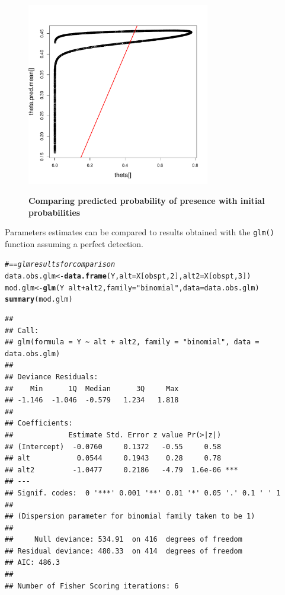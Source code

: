 \documentclass[a4paper, 12pt, leqno]{article}\usepackage[]{graphicx}\usepackage[]{color}
\makeatletter
\newcommand{\hlnum}[1]{\textcolor[rgb]{0.686,0.059,0.569}{#1}}%
\newcommand{\hlstr}[1]{\textcolor[rgb]{0.192,0.494,0.8}{#1}}%
\newcommand{\hlcom}[1]{\textcolor[rgb]{0.678,0.584,0.686}{\textit{#1}}}%
\newcommand{\hlopt}[1]{\textcolor[rgb]{0,0,0}{#1}}%
\newcommand{\hlstd}[1]{\textcolor[rgb]{0.345,0.345,0.345}{#1}}%
\newcommand{\hlkwb}[1]{\textcolor[rgb]{0.69,0.353,0.396}{#1}}%
\newcommand{\hlkwc}[1]{\textcolor[rgb]{0.333,0.667,0.333}{#1}}%
\newcommand{\hlkwd}[1]{\textcolor[rgb]{0.737,0.353,0.396}{\textbf{#1}}}%
\newenvironment{kframe}{%
 \def\at@end@of@kframe{}%
 \ifinner\ifhmode%
  \def\at@end@of@kframe{\end{minipage}}%
  \begin{minipage}{\columnwidth}%
 \fi\fi%
 \def\FrameCommand##1{\hskip\@totalleftmargin \hskip-\fboxsep
 \colorbox{shadecolor}{##1}\hskip-\fboxsep
     \hskip-\linewidth \hskip-\@totalleftmargin \hskip\columnwidth}%
 \MakeFramed {\advance\hsize-\width
   \@totalleftmargin\z@ \linewidth\hsize
   \@setminipage}}%
 {\par\unskip\endMakeFramed%
 \at@end@of@kframe}
\newenvironment{knitrout}{}{} %
\makeatother
\begin{document}
\begin{figure}[!h]
\begin{tabular}{cc}
  \end{tabular}
  \centering \includegraphics[width=8cm]{figures/pred-obs-siteocc.pdf} \\
  
  \caption{\textbf{Comparing predicted probability of presence with initial probabilities}}
  
  \label{fig:predictions-siteocc}
  
\end{figure}

Parameters estimates can be compared to results obtained with the \texttt{glm()} function
assuming a perfect detection.

\begin{knitrout}\small
{}\color{fgcolor}\begin{kframe}
\begin{alltt}
\hlcom{#== glm results for comparison}
\hlstd{data.obs.glm} \hlkwb{<-} \hlkwd{data.frame}\hlstd{(Y,}\hlkwc{alt}\hlstd{=X[obspt,}\hlnum{2}\hlstd{],}\hlkwc{alt2}\hlstd{=X[obspt,}\hlnum{3}\hlstd{])}
\hlstd{mod.glm} \hlkwb{<-} \hlkwd{glm}\hlstd{(Y}\hlopt{~}\hlstd{alt}\hlopt{+}\hlstd{alt2,}\hlkwc{family}\hlstd{=}\hlstr{"binomial"}\hlstd{,}\hlkwc{data}\hlstd{=data.obs.glm)}
\hlkwd{summary}\hlstd{(mod.glm)}
\end{alltt}
\begin{verbatim}
## 
## Call:
## glm(formula = Y ~ alt + alt2, family = "binomial", data = data.obs.glm)
## 
## Deviance Residuals: 
##    Min      1Q  Median      3Q     Max  
## -1.146  -1.046  -0.579   1.234   1.818  
## 
## Coefficients:
##             Estimate Std. Error z value Pr(>|z|)    
## (Intercept)  -0.0760     0.1372   -0.55     0.58    
## alt           0.0544     0.1943    0.28     0.78    
## alt2         -1.0477     0.2186   -4.79  1.6e-06 ***
## ---
## Signif. codes:  0 '***' 0.001 '**' 0.01 '*' 0.05 '.' 0.1 ' ' 1
## 
## (Dispersion parameter for binomial family taken to be 1)
## 
##     Null deviance: 534.91  on 416  degrees of freedom
## Residual deviance: 480.33  on 414  degrees of freedom
## AIC: 486.3
## 
## Number of Fisher Scoring iterations: 6
\end{verbatim}
\end{kframe}
\end{knitrout}
\end{document}

